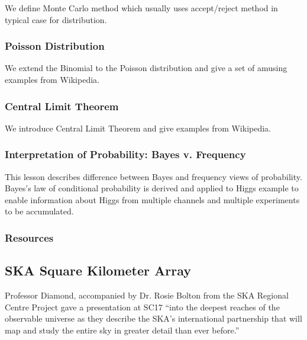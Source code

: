 We define Monte Carlo method which usually uses accept/reject method in
typical case for distribution.


\subsubsection{Poisson Distribution}\label{poisson-distribution}

We extend the Binomial to the Poisson distribution and give a set of
amusing examples from Wikipedia.


\subsubsection{Central Limit Theorem}\label{central-limit-theorem}

We introduce Central Limit Theorem and give examples from Wikipedia.


\subsubsection{Interpretation of Probability: Bayes v.
Frequency}\label{interpretation-of-probability-bayes-v.-frequency}

This lesson describes difference between Bayes and frequency views of
probability. Bayes's law of conditional probability is derived and
applied to Higgs example to enable information about Higgs from multiple
channels and multiple experiments to be accumulated.


\subsubsection{Resources}\label{resources-3}


\subsection{SKA Square Kilometer Array}


Professor Diamond, accompanied by Dr. Rosie Bolton from the SKA
Regional Centre Project gave a presentation at SC17 ``into the deepest
reaches of the observable universe as they describe the SKA’s
international partnership that will map and study the entire sky in
greater detail than ever before.''

